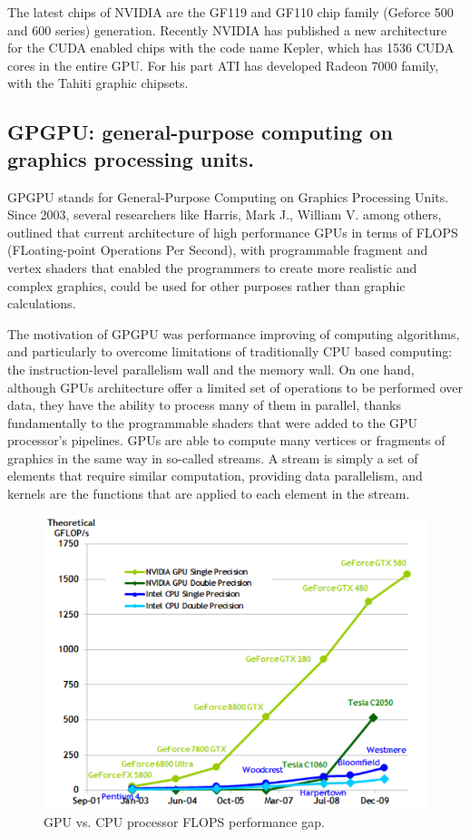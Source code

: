 \documentclass[thesis=M,english]{FITthesis}[2011/07/15]
\begin{document}
The latest chips of NVIDIA are the GF119 and GF110 chip family (Geforce 500 and 600 series) generation. Recently NVIDIA has published a new architecture for the CUDA enabled chips with the code name Kepler, which has 1536 CUDA cores in the entire GPU. For his part ATI has developed Radeon 7000 family, with the Tahiti graphic chipsets.

\subsection{GPGPU: general-purpose computing on graphics processing units.}
GPGPU stands for General-Purpose Computing on Graphics Processing Units. Since 2003, several researchers like Harris, Mark J., William V. among others, outlined that current architecture of high performance GPUs in terms of FLOPS (FLoating-point Operations Per Second), with programmable fragment and vertex shaders that enabled the programmers to create more realistic and complex graphics, could be used for other purposes rather than graphic calculations.

The motivation of GPGPU was performance improving of computing algorithms, and particularly to overcome limitations of traditionally CPU based computing: the instruction-level parallelism wall and the memory wall. On one hand, although GPUs architecture offer a limited set of operations to be performed over data, they have the ability to process many of them in parallel, thanks fundamentally to the programmable shaders that were added to the GPU processor’s pipelines. GPUs are able to compute many vertices or fragments of graphics in the same way in so-called streams. A stream is simply a set of elements that require similar computation, providing data parallelism, and kernels are the functions that are applied to each element in the stream.

\begin{figure}[h]
\centering
\includegraphics[scale=0.45]{images/cpuvsgpu.png}
\caption{GPU vs. CPU processor FLOPS performance gap.}
\label{fig:cpuvsgpu}
\end{figure}
\end{document}
